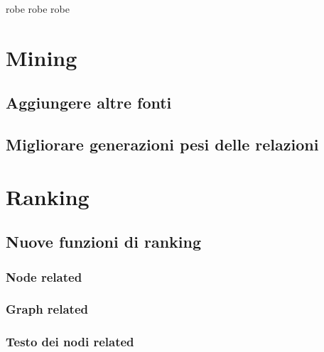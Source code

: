 



robe robe robe


\section{Mining}
\label{section:ranking}

\subsection {Aggiungere altre fonti} 
\subsection {Migliorare generazioni pesi delle relazioni} 



\section {Ranking}

\subsection {Nuove funzioni di ranking}

\subsubsection {Node related}
\subsubsection {Graph related}
\subsubsection {Testo dei nodi related}



